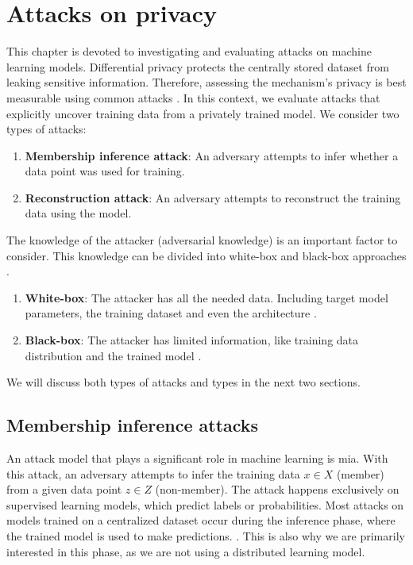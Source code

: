 \chapter{Attacks on privacy} \label{section: MIA}
This chapter is devoted to investigating and evaluating attacks on machine learning models.
Differential privacy protects the centrally stored dataset from leaking sensitive information.
Therefore, assessing the mechanism's privacy is best measurable using common attacks \citep{jayaraman_evaluating_nodate}.
In this context, we evaluate attacks that explicitly uncover training data from a privately trained model.
We consider two types of attacks:
\begin{enumerate}
  \item \textbf{Membership inference attack}: An adversary attempts to infer whether a data point was used for training.
  \item \textbf{Reconstruction attack}: An adversary attempts to reconstruct the training data using the model.
\end{enumerate}
The knowledge of the attacker (adversarial knowledge) is an important factor to consider.
This knowledge can be divided into white-box and black-box approaches \citep{hu_membership_2022}.
\begin{enumerate}
  \item \textbf{White-box}: The attacker has all the needed data. Including target model parameters, the training dataset and even the architecture \citep{hu_membership_2022}.
  \item \textbf{Black-box}: The attacker has limited information, like training data distribution and the trained model \citep{hu_membership_2022}.
\end{enumerate}
We will discuss both types of attacks and types in the next two sections.

\section{Membership inference attacks}
An attack model that plays a significant role in machine learning is \gls{mia}.
With this attack, an adversary attempts to infer the training data $x \in X$ (member) from a given data point $z \in Z$ (non-member).
The attack happens exclusively on supervised learning models, which predict labels or probabilities.
Most attacks on models trained on a centralized dataset occur during the inference phase, where the trained model is used to make predictions. \citep{rigaki_survey_2021}.
This is also why we are primarily interested in this phase, as we are not using a distributed learning model.

